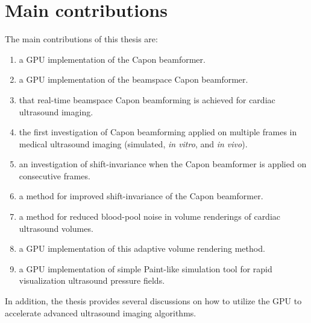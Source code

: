\section{Main contributions}
The main contributions of this thesis are:
\begin{enumerate}
\item a GPU implementation of the Capon beamformer.
\item a GPU implementation of the beamspace Capon beamformer.
\item that real-time beamspace Capon beamforming is achieved for cardiac ultrasound imaging.
\item the first investigation of Capon beamforming applied on multiple frames in medical ultrasound imaging (simulated, \textit{in vitro}, and \textit{in vivo}).
\item an investigation of shift-invariance when the Capon beamformer is applied on consecutive frames.
\item a method for improved shift-invariance of the Capon beamformer.
\item a method for reduced blood-pool noise in volume renderings of cardiac ultrasound volumes.
\item a GPU implementation of this adaptive volume rendering method.
\item a GPU implementation of simple Paint-like simulation tool for rapid visualization ultrasound pressure fields.
\end{enumerate}
In addition, the thesis provides several discussions on how to utilize the GPU to accelerate advanced ultrasound imaging algorithms. 

